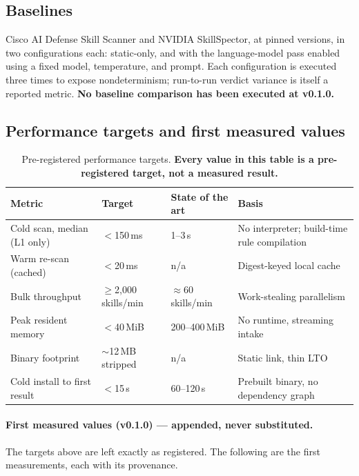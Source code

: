 \documentclass[11pt]{article}
\begin{document}
\subsection{Baselines}

Cisco AI Defense Skill Scanner and NVIDIA SkillSpector, at pinned versions, in two configurations each: static-only, and with the language-model pass enabled using a fixed model, temperature, and prompt. Each configuration is executed three times to expose nondeterminism; run-to-run verdict variance is itself a reported metric. \textbf{No baseline comparison has been executed at v0.1.0.}

\subsection{Performance targets and first measured values}
\label{sec:perf}

\begin{table}[htbp]
\centering
\caption{Pre-registered performance targets. \textbf{Every value in this table is a pre-registered target, not a measured result.}}
\label{tab:perf}
\small
\begin{tabularx}{\textwidth}{Xlll}
\toprule
Metric & Target & State of the art & Basis \\
\midrule
Cold scan, median (L1 only) & $<$150\,ms & 1--3\,s & No interpreter; build-time rule compilation \\
Warm re-scan (cached) & $<$20\,ms & n/a & Digest-keyed local cache \\
Bulk throughput & $\geq$2{,}000 skills/min & $\approx$60 skills/min & Work-stealing parallelism \\
Peak resident memory & $<$40\,MiB & 200--400\,MiB & No runtime, streaming intake \\
Binary footprint & $\sim$12\,MB stripped & n/a & Static link, thin LTO \\
Cold install to first result & $<$15\,s & 60--120\,s & Prebuilt binary, no dependency graph \\
\bottomrule
\end{tabularx}
\end{table}

\paragraph{First measured values (v0.1.0) --- appended, never substituted.} The targets above are left exactly as registered. The following are the first measurements, each with its provenance.
\end{document}
